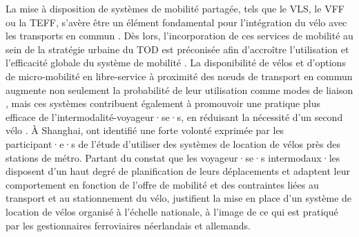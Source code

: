 \begin{refsegment}
La mise à disposition de systèmes de mobilité partagée, tels que le \acrshort{VLS}, le \acrshort{VFF} ou la \acrshort{TEFF}, s'avère être un élément fondamental pour l'intégration du vélo avec les transports en commun \textcolor{blue}{\autocite[11-12]{wu_measuring_2019}}. Dès lors, l'incorporation de ces services de mobilité au sein de la stratégie urbaine du \acrshort{TOD} est préconisée afin d'accroître l'utilisation et l'efficacité globale du système de mobilité \textcolor{blue}{\autocite[16]{tamakloe_determinants_2021}}. La disponibilité de vélos et d'options de micro-mobilité en libre-service à proximité des nœuds de transport en commun augmente non seulement la probabilité de leur utilisation comme modes de liaison \textcolor{blue}{\autocite[25]{guo_dockless_2021}}, mais ces systèmes contribuent également à promouvoir une pratique plus efficace de l'intermodalité-voyageur·se·s, en réduisant la nécessité d'un second vélo \textcolor{blue}{\autocite[10]{jonkeren_bicycle_2021}}. À Shanghai, \textcolor{blue}{\textcite[186]{pan_intermodal_2010}} ont identifié une forte volonté exprimée par les participant·e·s de l'étude d'utiliser des systèmes de location de vélos près des stations de métro. Partant du constat que les voyageur·se·s intermodaux·les disposent d'un haut degré de planification de leurs déplacements et adaptent leur comportement en fonction de l'offre de mobilité et des contraintes liées au transport et au stationnement du vélo, \textcolor{blue}{\textcite[196]{sherwin_practices_2011}} justifient la mise en place d'un système de location de vélos organisé à l'échelle nationale, à l'image de ce qui est pratiqué par les gestionnaires ferroviaires néerlandais et allemands.%


\end{refsegment}
